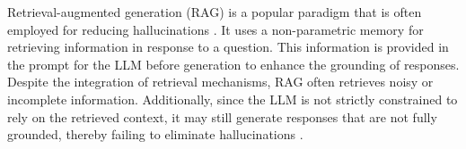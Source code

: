 Retrieval-augmented generation (RAG) \citep{knnlm, rag_og, guu2020retrieval, lewis2020retrieval} is a popular paradigm that is often employed for reducing hallucinations \citep{hallucination_survey_1}. It uses a non-parametric memory for retrieving information in response to a question. This information is provided in the prompt for the LLM before generation to enhance the grounding of responses.
Despite the integration of retrieval mechanisms, RAG often retrieves noisy or incomplete information.
Additionally, since the LLM is not strictly constrained to rely on the retrieved context, it may still generate responses that are not fully grounded, thereby failing to eliminate hallucinations \citep{barnett2024seven}.





